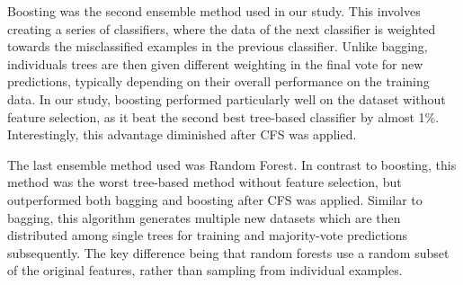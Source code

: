 Boosting was the second ensemble method used in our study. This involves creating a series of classifiers, where the data of the next classifier is weighted towards the misclassified examples in the previous classifier. Unlike bagging, individuals trees are then given different weighting in the final vote for new predictions, typically depending on their overall performance on the training data. In our study, boosting performed particularly well on the dataset without feature selection, as it beat the second best tree-based classifier by almost 1\%. Interestingly, this advantage diminished after CFS was applied.

The last ensemble method used was Random Forest. In contrast to boosting, this method was the worst tree-based method without feature selection, but outperformed both bagging and boosting after CFS was applied. Similar to bagging, this algorithm generates multiple new datasets which are then distributed among single trees for training and majority-vote predictions subsequently. The key difference being that random forests use a random subset of the original features, rather than sampling from individual examples.





